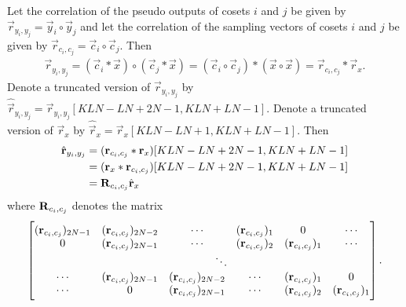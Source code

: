 \documentclass[a4paper, openany, oneside]{memoir}
\begin{document}
Let the correlation of the pseudo outputs of cosets $i$ and $j$ be given by $\vec{r}_{y_i,y_j} = \vec{y}_i \circ \vec{y}_j$ and let the correlation of the sampling vectors of cosets $i$ and $j$ be given by $\vec{r}_{c_i,c_j} = \vec{c}_i \circ \vec{c}_j$. Then
\begin{align*}
    \vec{r}_{y_i,y_j} =(\vec{c}_i \ast \vec{x}) \circ (\vec{c}_j \ast \vec{x}) = (\vec{c}_i \circ \vec{c}_j) \ast (\vec{x} \circ \vec{x}) = \vec{r}_{c_i,c_j} \ast \vec{r}_x.
\end{align*}
Denote a truncated version of $\vec{r}_{y_i,y_j}$ by $\hat{\vec{r}}_{y_i,y_j} = \vec{r}_{y_i,y_j}[KLN-LN+2N-1,KLN+LN-1]$. Denote a truncated version of $\vec{r}_x$ by $\hat{\vec{r}}_x = \vec{r}_x [KLN-LN+1,KLN+LN-1]$. Then
\begin{align*}
    \hat{\boldsymbol{\mathbf{r}}}_{y_i,y_j}
    &= (\boldsymbol{\mathbf{r}}_{c_i,c_j} \ast \boldsymbol{\mathbf{r}}_x)[KLN-LN+2N-1,KLN+LN-1]\\
    &= (\boldsymbol{\mathbf{r}}_x \ast \boldsymbol{\mathbf{r}}_{c_i,c_j})[KLN-LN+2N-1,KLN+LN-1] \\
    &= \boldsymbol{\mathbf{R}}_{c_i,c_j} \hat{\boldsymbol{\mathbf{r}}}_x
\end{align*}
where $\boldsymbol{\mathbf{R}}_{c_i,c_j}$ denotes the matrix
\begin{align*}
    \begin{bmatrix}
        (\vec{r}_{c_i,c_j})_{2N-1} & (\vec{r}_{c_i,c_j})_{2N-2} & \cdots &(\vec{r}_{c_i,c_j})_{1} & 0 & \cdots  \\
        0 & (\vec{r}_{c_i,c_j})_{2N-1} & \cdots & (\vec{r}_{c_i,c_j})_{2} & (\vec{r}_{c_i,c_j})_{1} & \cdots \\
        && \multicolumn{2}{c}{\ddots} \\
        \cdots & (\vec{r}_{c_i,c_j})_{2N-1} & (\vec{r}_{c_i,c_j})_{2N-2} & \cdots & (\vec{r}_{c_i,c_j})_{1} & 0 \\
        \cdots & 0 & (\vec{r}_{c_i,c_j})_{2N-1} & \cdots &(\vec{r}_{c_i,c_j})_{2} & (\vec{r}_{c_i,c_j})_{1} 
    \end{bmatrix}.
\end{align*}
\end{document}
